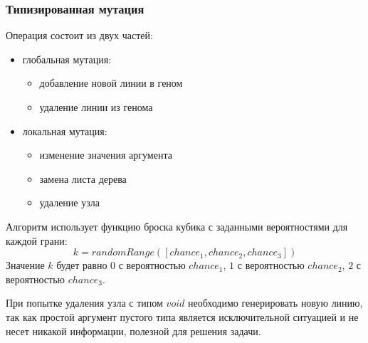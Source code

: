 \documentclass[russian,utf8,emptystyle]{eskdtext}
\begin{document}
\begin{spacing}{1.5}
\subsubsection{Типизированная мутация}
Операция состоит из двух частей:
\begin{itemize}
\item глобальная мутация:
\begin{itemize}
\item добавление новой линии в геном 
\item удаление линии из генома
\end{itemize}
\item локальная мутация:
\begin{itemize}
\item изменение значения аргумента
\item замена листа дерева
\item удаление узла
\end{itemize}
\end{itemize}

Алгоритм использует функцию броска кубика с заданными вероятностями для каждой грани:
$$
k = randomRange([chance_1, chance_2, chance_3])
$$
Значение $k$ будет равно $0$ с вероятностью $chance_1$, $1$ с вероятностью $chance_2$, $2$ с вероятностью $chance_3$.

При попытке удаления узла с типом $void$ необходимо генерировать новую линию, так как простой аргумент пустого типа является исключительной ситуацией и не несет никакой информации, полезной для решения задачи.


\end{spacing}
\end{document}

